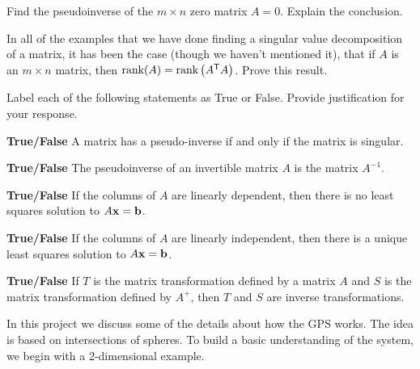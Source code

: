 	\ea
	
\item Find the pseudoinverse of the $m \times n$ zero matrix $A=0$. Explain the conclusion.

\item In all of the examples that we have done finding a singular value decomposition of a matrix, it has been the case (though we haven't mentioned it), that if $A$ is an $m \times n$ matrix, then $\text{rank}(A) = \text{rank}\left(A^{\mathsf{T}}A\right)$. Prove this result.

	
\item Label each of the following statements as True or False. Provide justification for your response.
	\ba
	\item \textbf{True/False} A matrix has a pseudo-inverse if and only if the matrix is singular. 
	\item \textbf{True/False} The pseudoinverse of an invertible matrix $A$ is the matrix $A^{-1}$. 
	\item \textbf{True/False} If the columns of $A$ are linearly dependent, then there is no least squares solution to $A\mathbf{x} = \mathbf{b}$. 
	\item \textbf{True/False} If the columns of $A$ are linearly independent, then there is a unique least squares solution to $A\mathbf{x} = \mathbf{b}$.
	\item \textbf{True/False} If $T$ is the matrix transformation defined by a matrix $A$ and $S$ is the matrix transformation defined by $A^{+}$, then $T$ and $S$ are inverse transformations. 
	\ea


\ee

\label{sec:proj_gps}

In this project we discuss some of the details about how the GPS works. The idea is based on intersections of spheres. To build a basic understanding of the system, we begin with a 2-dimensional example. 

